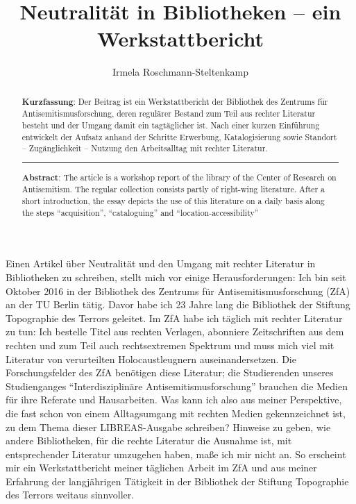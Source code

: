 \documentclass[a4paper,
fontsize=11pt,
oneside,
numbers=noperiodatend,
parskip=half-,
bibliography=totoc,
final
]{scrartcl}
\title{\LARGE{Neutralität in Bibliotheken -- ein Werkstattbericht}}%
\author{Irmela Roschmann-Steltenkamp} %
\date{}
\begin{document}
\maketitle
\thispagestyle{fancyplain} 

\begin{abstract}
\textbf{Kurzfassung}: Der Beitrag ist ein Werkstattbericht der
Bibliothek des Zentrums für Antisemitismusforschung, deren regulärer
Bestand zum Teil aus rechter Literatur besteht und der Umgang damit ein
tagtäglicher ist. Nach einer kurzen Einführung entwickelt der Aufsatz
anhand der Schritte Erwerbung, Katalogisierung sowie Standort --
Zugänglichkeit -- Nutzung den Arbeitsalltag mit rechter Literatur.

\begin{center}\rule{0.5\linewidth}{\linethickness}\end{center}

\textbf{Abstract}: The article is a workshop report of the library of
the Center of Research on Antisemitism. The regular collection consists
partly of right-wing literature. After a short introduction, the essay
depicts the use of this literature on a daily basis along the steps
``acquisition'', ``cataloguing'' and ``location-accessibility''
\end{abstract}

Einen Artikel über Neutralität und den Umgang mit rechter Literatur in
Bibliotheken zu schreiben, stellt mich vor einige Herausforderungen: Ich
bin seit Oktober 2016 in der Bibliothek des Zentrums für
Antisemitismusforschung (ZfA) an der TU Berlin tätig. Davor habe ich 23
Jahre lang die Bibliothek der Stiftung Topographie des Terrors geleitet.
Im ZfA habe ich täglich mit rechter Literatur zu tun: Ich bestelle Titel
aus rechten Verlagen, abonniere Zeitschriften aus dem rechten und zum
Teil auch rechtsextremen Spektrum und muss mich viel mit Literatur von
verurteilten Holocaustleugnern auseinandersetzen. Die Forschungsfelder
des ZfA benötigen diese Literatur; die Studierenden unseres
Studienganges \enquote{Interdisziplinäre Antisemitismusforschung}
brauchen die Medien für ihre Referate und Hausarbeiten. Was kann ich
also aus meiner Perspektive, die fast schon von einem Alltagsumgang mit
rechten Medien gekennzeichnet ist, zu dem Thema dieser LIBREAS-Ausgabe
schreiben? Hinweise zu geben, wie andere Bibliotheken, für die rechte
Literatur die Ausnahme ist, mit entsprechender Literatur umzugehen
haben, maße ich mir nicht an. So erscheint mir ein Werkstattbericht
meiner täglichen Arbeit im ZfA und aus meiner Erfahrung der langjährigen
Tätigkeit in der Bibliothek der Stiftung Topographie des Terrors weitaus
sinnvoller.
\end{document}

